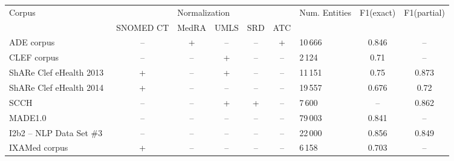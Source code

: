 \begin{tabular}{|p{}|c|c|c|c|c|p{}|c|c|}
\hline
\multirow{2}{*}{Corpus}                            & \multicolumn{5}{c|}{Normalization}   & \multirow{2}{*}{Num. Entities} & \multirow{2}{*}{F1(exact)} & \multirow{2}{*}{F1(partial)} \\ \cline{2-6}
                                                   & SNOMED CT & MedRA & UMLS & SRD & ATC &                                &                            &                              \\ \hline
ADE corpus~\cite{li2017neural}                     & --        & +     & --   & --  & +   & 10\,666                          & 0.846                      & --                           \\ \hline
CLEF corpus~\cite{roberts2008combining}            & --        & --    & +    & --  & --  & 2\,124                           & 0.71                       & --                           \\ \hline
ShARe Clef eHealth 2013~\cite{tang2013recognizing} & +         & --    & +    & --  & --  & 11\,151                          & 0.75                       & 0.873                        \\ \hline
ShARe Clef eHealth 2014~\cite{johri2014optimizing} & +         & --    & --   & --  & --  & 19\,557                          & 0.676                      & 0.72                         \\ \hline
SCCH~\cite{shelmanov2015information}               & --        & --    & +    & +   & --  & 7\,600                           & --                         & 0.862                        \\ \hline
MADE1.0~\cite{wunnava2018bidirectional}            & --        & --    & --   & --  & --  & 79\,003                          & 0.841                      & --                           \\ \hline
I2b2 -- NLP Data Set \#3~\cite{patrick2010high} & --        & --    & --   & --  & --  & 22\,000 & 0.856                      & 0.849                           \\ \hline
IXAMed corpus~\cite{perez2017semi}                 & +         & --    & --   & --  & --  & 6\,158                           & 0.703                      & --                           \\ \hline
\end{tabular}

